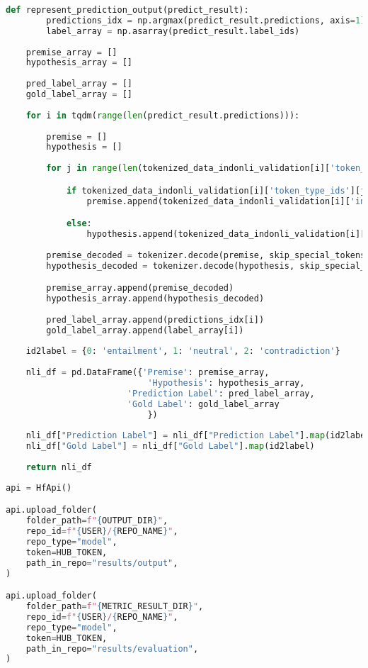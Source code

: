 \begin{lstlisting}[language=Python, caption=Representasi prediksi jawaban \emph{sequence classification}]
def represent_prediction_output(predict_result):
        predictions_idx = np.argmax(predict_result.predictions, axis=1)
        label_array = np.asarray(predict_result.label_ids)
        
    premise_array = []
    hypothesis_array = []
    
    pred_label_array = []
    gold_label_array = []
    
    for i in tqdm(range(len(predict_result.predictions))):
        
        premise = []
        hypothesis = []
        
        for j in range(len(tokenized_data_indonli_validation[i]['token_type_ids'])):

            if tokenized_data_indonli_validation[i]['token_type_ids'][j] == 0:
                premise.append(tokenized_data_indonli_validation[i]['input_ids'][j])

            else:
                hypothesis.append(tokenized_data_indonli_validation[i]['input_ids'][j])
        
        premise_decoded = tokenizer.decode(premise, skip_special_tokens=True)
        hypothesis_decoded = tokenizer.decode(hypothesis, skip_special_tokens=True)

        premise_array.append(premise_decoded)
        hypothesis_array.append(hypothesis_decoded)
        
        pred_label_array.append(predictions_idx[i])
        gold_label_array.append(label_array[i])
        
    id2label = {0: 'entailment', 1: 'neutral', 2: 'contradiction'}
    
    nli_df = pd.DataFrame({'Premise': premise_array, 
                            'Hypothesis': hypothesis_array,
                        'Prediction Label': pred_label_array,
                        'Gold Label': gold_label_array
                            })
    
    nli_df["Prediction Label"] = nli_df["Prediction Label"].map(id2label)
    nli_df["Gold Label"] = nli_df["Gold Label"].map(id2label)
    
    return nli_df
\end{lstlisting}

\begin{lstlisting}[language=Python, caption=Melakukan \emph{push} \emph{sequence classification} ke akun Hugging Face]
api = HfApi()

api.upload_folder(
    folder_path=f"{OUTPUT_DIR}",
    repo_id=f"{USER}/{REPO_NAME}",
    repo_type="model",
    token=HUB_TOKEN,
    path_in_repo="results/output",
)

api.upload_folder(
    folder_path=f"{METRIC_RESULT_DIR}",
    repo_id=f"{USER}/{REPO_NAME}",
    repo_type="model",
    token=HUB_TOKEN,
    path_in_repo="results/evaluation",
)
\end{lstlisting}

